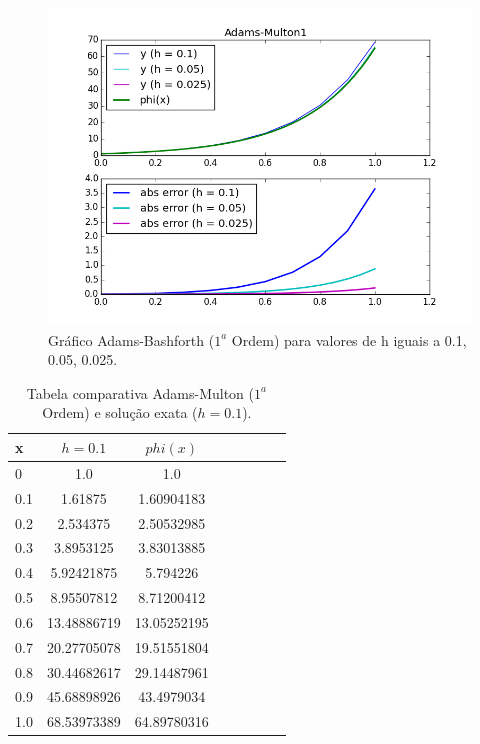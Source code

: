 \documentclass[a4paper]{article}
\begin{document}
\begin{figure}[!htb]
\centering
\includegraphics[width=1.0\textwidth]{plots/Adams-Multon1.png}
\caption{\label{fig:multon1}Gráfico Adams-Bashforth ($1^a$ Ordem) para valores de h iguais a 0.1, 0.05, 0.025.}
\end{figure}

\begin{table}[!h]
\centering
\begin{tabular}{l*{6}{c}r}
x               & $h=0.1$ & $phi(x)$ \\
\hline
0                   & 1.0 & 1.0          \\
0.1                 & 1.61875 & 1.60904183   \\
0.2                 & 2.534375 & 2.50532985   \\
0.3                 & 3.8953125 & 3.83013885   \\
0.4                 & 5.92421875 & 5.794226     \\
0.5                 & 8.95507812 & 8.71200412   \\
0.6                 & 13.48886719 & 13.05252195  \\
0.7                 & 20.27705078 & 19.51551804  \\
0.8                 & 30.44682617 & 29.14487961  \\
0.9                 & 45.68898926 & 43.4979034   \\
1.0                 & 68.53973389 & 64.89780316  \\
\end{tabular}
\caption{\label{tab:multon1}Tabela comparativa Adams-Multon ($1^a$ Ordem) e solução exata ($h=0.1$).}
\end{table}
\end{document}
